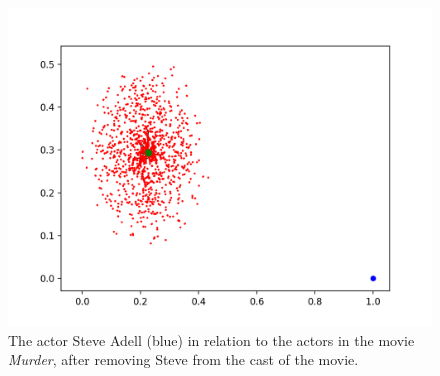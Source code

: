 \documentclass[12pt]{ieeeconf}      %
\begin{document}
\begin{figure}[H]
  \begin{center}
   \includegraphics[width=.75\textwidth]{figures/network-path-existing}
    \caption{The actor Steve Adell (blue) in relation to the actors in the movie \textit{Murder}, after removing Steve from the cast of the movie.}
    \label{network:path-existing}
  \end{center}
\end{figure}
\end{document}
